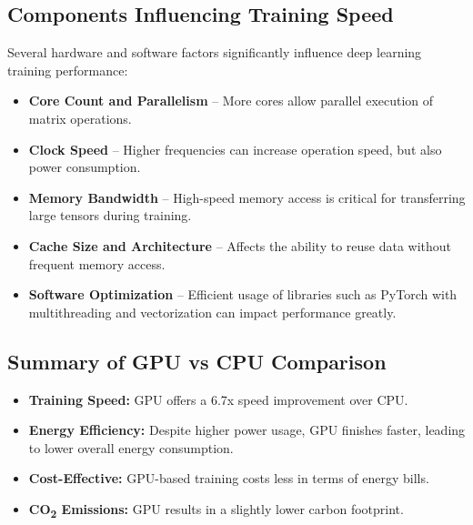 \subsection{Components Influencing Training Speed}

Several hardware and software factors significantly influence deep learning training performance:

\begin{itemize}
    \item \textbf{Core Count and Parallelism} – More cores allow parallel execution of matrix 
    operations. 

    \item \textbf{Clock Speed} – Higher frequencies can increase operation speed, but also power 
    consumption. 

    \item \textbf{Memory Bandwidth} – High-speed memory access is critical for transferring large 
    tensors during training. 

    \item \textbf{Cache Size and Architecture} – Affects the ability to reuse data without frequent 
    memory access. 

    \item \textbf{Software Optimization} – Efficient usage of libraries such as PyTorch with 
    multithreading and vectorization can impact performance greatly. 
\end{itemize}


\subsection{Summary of GPU vs CPU Comparison}

\begin{itemize}
    \item \textbf{Training Speed:} GPU offers a 6.7x speed improvement over CPU.
    \item \textbf{Energy Efficiency:} Despite higher power usage, GPU finishes faster, leading to 
    lower overall energy consumption.
    \item \textbf{Cost-Effective:} GPU-based training costs less in terms of energy bills.
    \item \textbf{CO\textsubscript{2} Emissions:} GPU results in a slightly lower carbon footprint.
\end{itemize}